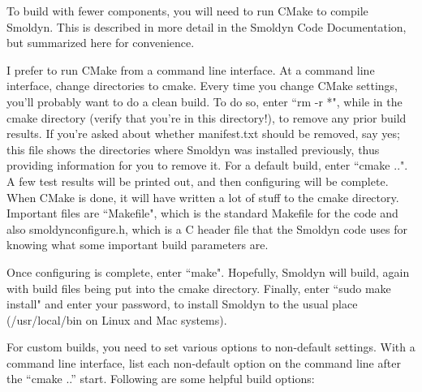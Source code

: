 \documentclass {book}
\begin{document}
To build with fewer components, you will need to run CMake to compile Smoldyn. This is described in more detail in the Smoldyn Code Documentation, but summarized here for convenience.

I prefer to run CMake from a command line interface. At a command line interface, change directories to cmake. Every time you change CMake settings, you'll probably want to do a clean build. To do so, enter ``rm -r *", while in the cmake directory (verify that you're in this directory!), to remove any prior build results. If you're asked about whether manifest.txt should be removed, say yes; this file shows the directories where Smoldyn was installed previously, thus providing information for you to remove it. For a default build, enter ``cmake ..". A few test results will be printed out, and then configuring will be complete. When CMake is done, it will have written a lot of stuff to the cmake directory. Important files are ``Makefile", which is the standard Makefile for the code and also smoldynconfigure.h, which is a C header file that the Smoldyn code uses for knowing what some important build parameters are.

Once configuring is complete, enter ``make". Hopefully, Smoldyn will build, again with build files being put into the cmake directory. Finally, enter ``sudo make install" and enter your password, to install Smoldyn to the usual place (/usr/local/bin on Linux and Mac systems).

For custom builds, you need to set various options to non-default settings. With a command line interface, list each non-default option on the command line after the ``cmake ..'' start. Following are some helpful build options:
\end{document}
